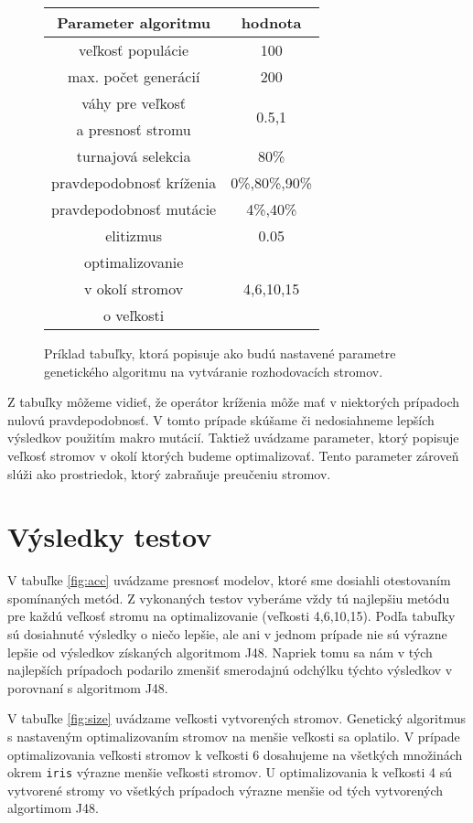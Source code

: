 \begin{figure}[h]
\centering
\begin{tabular}{|c c|}
\hline 
Parameter algoritmu & hodnota \\
\hline
veľkosť populácie & 100 \\
\hline
max. počet generácií & 200 \\
\hline
váhy pre veľkosť & \multirow{2}{*}{0.5,1} \\
a presnosť stromu & \\
\hline
turnajová selekcia & 80\% \\
\hline
pravdepodobnosť kríženia & 0\%,80\%,90\%\\
\hline
pravdepodobnosť mutácie & 4\%,40\%\\
\hline
elitizmus & 0.05\\
\hline
optimalizovanie & \multirow{3}{*}{4,6,10,15}\\
v okolí stromov & \\
o veľkosti & \\
\hline
\end{tabular}
\caption{Príklad tabuľky, ktorá popisuje ako budú nastavené parametre genetického algoritmu na vytváranie rozhodovacích stromov.}\label{fig:configs}
\end{figure}

Z tabuľky môžeme vidieť, že operátor kríženia môže mať v niektorých prípadoch nulovú pravdepodobnosť. V tomto prípade skúšame či nedosiahneme lepších výsledkov použitím makro mutácií.
Taktiež uvádzame parameter, ktorý popisuje veľkosť stromov v okolí ktorých budeme optimalizovať. Tento parameter zároveň slúži ako prostriedok, ktorý zabraňuje preučeniu stromov.

\section{Výsledky testov}\label{kap5:Results}
V tabuľke \ref{fig:acc} uvádzame presnosť modelov, ktoré sme dosiahli otestovaním spomínaných metód. Z vykonaných testov vyberáme vždy tú najlepšiu metódu pre každú veľkosť stromu na optimalizovanie (veľkosti 4,6,10,15). Podľa tabuľky sú dosiahnuté výsledky o niečo lepšie, ale ani v jednom prípade nie sú výrazne lepšie od výsledkov získaných algoritmom J48. Napriek tomu sa nám v tých najlepších prípadoch podarilo zmenšiť smerodajnú odchýlku týchto výsledkov v porovnaní s algoritmom J48.

V tabuľke \ref{fig:size} uvádzame veľkosti vytvorených stromov. Genetický algoritmus s nastaveným optimalizovaním stromov na menšie veľkosti sa oplatilo. V prípade optimalizovania veľkosti stromov k veľkosti 6 dosahujeme na všetkých množinách okrem \verb|iris| výrazne menšie veľkosti stromov. U optimalizovania k veľkosti 4 sú vytvorené stromy vo všetkých prípadoch výrazne menšie od tých vytvorených algortimom J48.

